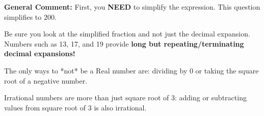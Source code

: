 \documentclass{extbook}[14pt]
\begin{document}
\begin{enumerate}
{\textbf{General Comment:} First, you \textbf{NEED} to simplify the expression. This question simplifies to $200$. 
 
 Be sure you look at the simplified fraction and not just the decimal expansion. Numbers such as 13, 17, and 19 provide \textbf{long but repeating/terminating decimal expansions!} 
 
 The only ways to *not* be a Real number are: dividing by 0 or taking the square root of a negative number. 
 
 Irrational numbers are more than just square root of 3: adding or subtracting values from square root of 3 is also irrational.
}
\end{enumerate}
\end{document}
